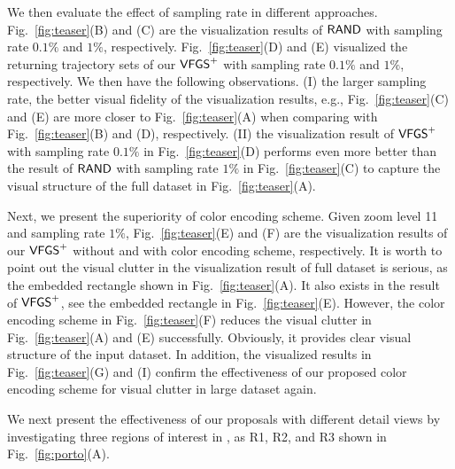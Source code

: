 We then evaluate the effect of sampling rate in different approaches.
Fig.~\ref{fig:teaser}(B) and (C) are the visualization results of $\mathsf{RAND}{}$ with sampling rate $0.1\%$ and $1\%$, respectively.
Fig.~\ref{fig:teaser}(D) and (E) visualized the returning trajectory sets of our $\mathsf{VFGS}^{+}{}$ with sampling rate $0.1\%$ and $1\%$, respectively.
We then have the following observations.
(I) the larger sampling rate, the better visual fidelity of the visualization results, e.g.,
Fig.~\ref{fig:teaser}(C) and (E) are more closer to Fig.~\ref{fig:teaser}(A) when comparing with Fig.~\ref{fig:teaser}(B) and (D), respectively.
(II) the visualization result of $\mathsf{VFGS}^{+}$ with sampling rate $0.1\%$ in Fig.~\ref{fig:teaser}(D)
performs even more better than the result of $\mathsf{RAND}{}$ with sampling rate $1\%$ in Fig.~\ref{fig:teaser}(C) to capture the visual structure of the full dataset in Fig.~\ref{fig:teaser}(A).


Next, we present the superiority of color encoding scheme.
Given zoom level 11 and sampling rate $1\%$, Fig.~\ref{fig:teaser}(E) and (F) are the visualization results of our $\mathsf{VFGS}^{+}$ without and with color encoding scheme, respectively.
It is worth to point out the visual clutter in the visualization result of full dataset is serious, as the embedded rectangle shown in Fig.~\ref{fig:teaser}(A).
It also exists in the result of $\mathsf{VFGS}^{+}$, see the embedded rectangle in Fig.~\ref{fig:teaser}(E).
However, the color encoding scheme in Fig.~\ref{fig:teaser}(F) reduces the visual clutter in Fig.~\ref{fig:teaser}(A) and (E) successfully.
Obviously, it provides clear visual structure of the input dataset.
In addition, the visualized results in Fig.~\ref{fig:teaser}(G) and (I) confirm the effectiveness of our proposed color encoding scheme for visual clutter in large dataset again.

We next present the effectiveness of our proposals with different detail views by investigating three regions of interest in \pt{}, as R1, R2, and R3 shown in Fig.~\ref{fig:porto}(A).

